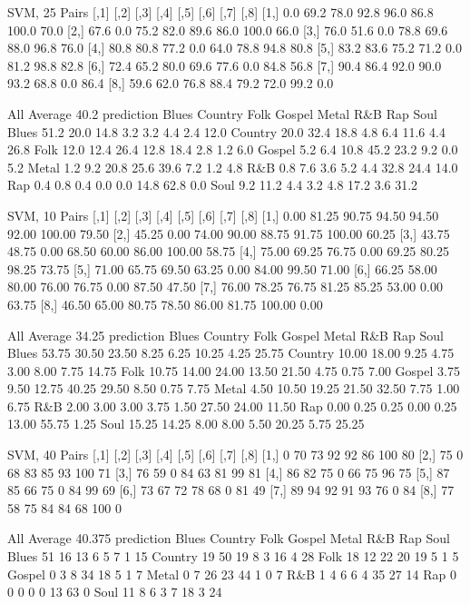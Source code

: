 \documentclass[a4paper,oneside]{article}
\begin{document}
SVM, 25
Pairs
     [,1] [,2] [,3] [,4] [,5] [,6]  [,7] [,8]
[1,]  0.0 69.2 78.0 92.8 96.0 86.8 100.0 70.0
[2,] 67.6  0.0 75.2 82.0 89.6 86.0 100.0 66.0
[3,] 76.0 51.6  0.0 78.8 69.6 88.0  96.8 76.0
[4,] 80.8 80.8 77.2  0.0 64.0 78.8  94.8 80.8
[5,] 83.2 83.6 75.2 71.2  0.0 81.2  98.8 82.8
[6,] 72.4 65.2 80.0 69.6 77.6  0.0  84.8 56.8
[7,] 90.4 86.4 92.0 90.0 93.2 68.8   0.0 86.4
[8,] 59.6 62.0 76.8 88.4 79.2 72.0  99.2  0.0

All
Average 40.2
prediction Blues Country Folk Gospel Metal  R\&B  Rap Soul
   Blues    51.2    20.0 14.8    3.2   3.2  4.4  2.4 12.0
   Country  20.0    32.4 18.8    4.8   6.4 11.6  4.4 26.8
   Folk     12.0    12.4 26.4   12.8  18.4  2.8  1.2  6.0
   Gospel    5.2     6.4 10.8   45.2  23.2  9.2  0.0  5.2
   Metal     1.2     9.2 20.8   25.6  39.6  7.2  1.2  4.8
   R\&B       0.8     7.6  3.6    5.2   4.4 32.8 24.4 14.0
   Rap       0.4     0.8  0.4    0.0   0.0 14.8 62.8  0.0
   Soul      9.2    11.2  4.4    3.2   4.8 17.2  3.6 31.2

SVM, 10
Pairs
      [,1]  [,2]  [,3]  [,4]  [,5]  [,6]   [,7]  [,8]
[1,]  0.00 81.25 90.75 94.50 94.50 92.00 100.00 79.50
[2,] 45.25  0.00 74.00 90.00 88.75 91.75 100.00 60.25
[3,] 43.75 48.75  0.00 68.50 60.00 86.00 100.00 58.75
[4,] 75.00 69.25 76.75  0.00 69.25 80.25  98.25 73.75
[5,] 71.00 65.75 69.50 63.25  0.00 84.00  99.50 71.00
[6,] 66.25 58.00 80.00 76.00 76.75  0.00  87.50 47.50
[7,] 76.00 78.25 76.75 81.25 85.25 53.00   0.00 63.75
[8,] 46.50 65.00 80.75 78.50 86.00 81.75 100.00  0.00

All
Average 34.25
prediction Blues Country  Folk Gospel Metal   R\&B   Rap  Soul
   Blues   53.75   30.50 23.50   8.25  6.25 10.25  4.25 25.75
   Country 10.00   18.00  9.25   4.75  3.00  8.00  7.75 14.75
   Folk    10.75   14.00 24.00  13.50 21.50  4.75  0.75  7.00
   Gospel   3.75    9.50 12.75  40.25 29.50  8.50  0.75  7.75
   Metal    4.50   10.50 19.25  21.50 32.50  7.75  1.00  6.75
   R\&B      2.00    3.00  3.00   3.75  1.50 27.50 24.00 11.50
   Rap      0.00    0.25  0.25   0.00  0.25 13.00 55.75  1.25
   Soul    15.25   14.25  8.00   8.00  5.50 20.25  5.75 25.25

SVM, 40
Pairs
     [,1] [,2] [,3] [,4] [,5] [,6] [,7] [,8]
[1,]    0   70   73   92   92   86  100   80
[2,]   75    0   68   83   85   93  100   71
[3,]   76   59    0   84   63   81   99   81
[4,]   86   82   75    0   66   75   96   75
[5,]   87   85   66   75    0   84   99   69
[6,]   73   67   72   78   68    0   81   49
[7,]   89   94   92   91   93   76    0   84
[8,]   77   58   75   84   84   68  100    0

All
Average 40.375
prediction Blues Country Folk Gospel Metal R\&B Rap Soul
   Blues      51      16   13      6     5   7   1   15
   Country    19      50   19      8     3  16   4   28
   Folk       18      12   22     20    19   5   1    5
   Gospel      0       3    8     34    18   5   1    7
   Metal       0       7   26     23    44   1   0    7
   R\&B         1       4    6      6     4  35  27   14
   Rap         0       0    0      0     0  13  63    0
   Soul       11       8    6      3     7  18   3   24
\end{document}
